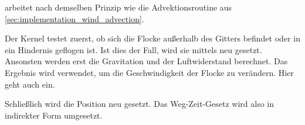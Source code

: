  arbeitet nach
demselben Prinzip wie die Advektionsroutine aus
\cref{sec:implementation_wind_advection}.

Der Kernel testet zuerst, ob sich die Flocke außerhalb des Gitters
befindet oder in ein Hindernis geflogen ist. Ist dies der Fall, wird
sie mittels  neu gesetzt. Ansonsten
werden erst die Gravitation und der Luftwiderstand berechnet. Das
Ergebnis wird verwendet, um die Geschwindigkeit der Flocke zu
verändern. Hier geht auch  ein.

Schließlich wird die Position neu gesetzt. Das Weg-Zeit-Gesetz wird
also in indirekter Form umgesetzt.
